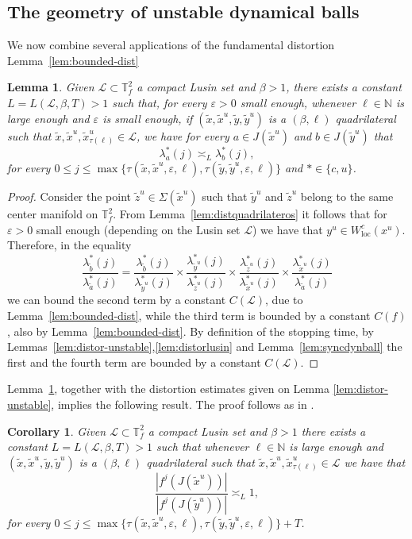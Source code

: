 \documentclass[a4paper,11pt,reqno]{amsart}
\newcommand{\N}{{\mathbb N}}
\newcommand{\TTf}{{\mathbb{T}_f^2}}
\newcommand{\loc}{{\operatorname{loc}}}
\newcommand{\cL}{{\mathcal L}}
\newcommand{\eps}{\varepsilon}
\newcommand{\tix}{\tilde{x}}
\newcommand{\ta}{\tilde{a}}
\newcommand{\tb}{\tilde{b}}
\newtheorem{corollary}{Corollary}
\newtheorem{lemma}[theorem]{Lemma}
\theoremstyle{definition}
\begin{document}
\subsection{The geometry of unstable dynamical balls}

We now combine several applications of the fundamental distortion Lemma~\ref{lem:bounded-dist}

\begin{lemma}
	\label{lem:distormagic}
	Given $\cL\subset\TTf$ a compact Lusin set and $\beta>1$, there exists a constant $L=L(\cL,\beta,T)>1$ such that, for every $\eps>0$ small enough, whenever $\ell\in\N$ is large enough and $\eps$ is small enough, if $(\tix,\tix^u,\tilde{y},\tilde{y}^u)$ is a $(\beta,\ell)$ quadrilateral such that $\tix,\tix^u,\tix^u_{\tau(\ell)}\in\cL$, we have for every $a\in J(\tix^u)$ and $b\in J(\tilde{y}^u)$ that
	\[
	\lambda^{*}_a(j)\asymp_L{\lambda^{*}_b(j)},
	\]
	for every $0\leq j\leq \max\{\tau(\tix,\tix^u,\eps,\ell),\tau(\tilde{y},\tilde{y}^u,\eps,\ell)\}$ and $* \in \{c,u\}$.
\end{lemma}
\begin{proof}
Consider the point $\tilde{z}^u\in\Sigma(\tix^u)$ such that $\tilde{y}^u$ and $\tilde{z}^u$ belong to the same center manifold on $\TTf$. From Lemma~\ref{lem:distquadrilateros} it follows that for $\eps>0$ small enough (depending on the Lusin set $\cL$) we have that $y^u\in W^c_{\loc}(x^u)$. Therefore, in the equality
\[
\frac{\lambda^*_{\tb}(j)}{\lambda^*_{\ta}(j)}=\frac{\lambda^*_{\tb}(j)}{\lambda^*_{\tilde{y}^u}(j)}\times\frac{\lambda^*_{\tilde{y}^u}(j)}{\lambda^*_{\tilde{z}^u}(j)}\times\frac{\lambda^*_{\tilde{z}^u}(j)}{\lambda^*_{\tilde{x}^u}(j)}\times\frac{\lambda^*_{\tilde{x}^u}(j)}{\lambda^*_{\tilde{a}}(j)}
\] 
we can bound the second term by a constant $C(\cL)$, due to Lemma~\ref{lem:bounded-dist}, while the third term is bounded by a constant $C(f)$, also by Lemma~\ref{lem:bounded-dist}. By definition of the stopping time, by Lemmas~\ref{lem:distor-unstable},\ref{lem:distorlusin} and Lemma~\ref{lem:syncdynball}  the first and the fourth term are bounded by a constant $C(\cL)$. 
\end{proof}


Lemma~\ref{lem:distormagic}, together with the distortion estimates given on Lemma \ref{lem:distor-unstable}, implies the following result. The proof follows as in \cite[Corollary 10.6]{ALOS}.

\begin{corollary}
    \label{cor:tamanhocomparavel}
    Given $\cL\subset\TTf$ a compact Lusin set and $\beta>1$ there exists a constant $L=L(\cL,\beta,T)>1$ such that whenever $\ell\in\N$ is large enough and $(\tix,\tix^u,\tilde{y},\tilde{y}^u)$ is a $(\beta,\ell)$ quadrilateral such that $\tix,\tix^u,\tix^u_{\tau(\ell)}\in\cL$ we have that 
    \[
    \frac{\left|f^j(J(\tix^u))\right|}{\left|f^j(J(\tilde{y}^u))\right|}\asymp_L 1,
    \]
    for every $0\leq j\leq \max\{\tau(\tix,\tix^u,\eps,\ell),\tau(\tilde{y},\tilde{y}^u,\eps,\ell)\}+T$.
\end{corollary}
\end{document}
